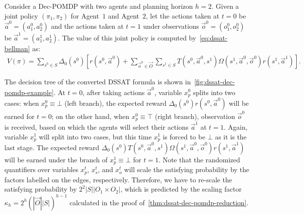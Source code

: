 \begin{example}
    Consider a Dec-POMDP with two agents and planning horizon $h=2$.
    Given a joint policy $(\pi_1,\pi_2)$ for Agent~$1$ and Agent~$2$,
    let the actions taken at $t=0$ be $\vec{a}^0=(a_1^0,a_2^0)$ and
    the actions taken at $t=1$ under observations $\vec{o}^0=(o_1^0,o_2^0)$ be $\vec{a}^1=(a_1^1,a_2^1)$.
    The value of this joint policy is computed by~\cref{eq:dssat-bellman} as:
    \begin{align*}
        V(\pi)=
        \sum_{s^0\in S}\Delta_0(s^0)[r(s^0,\vec{a}^0)+
            \sum_{\vec{o}^0\in\vec{O}}\sum_{s^1\in S}T(s^0,\vec{a}^0,s^1)\Omega(s^1,\vec{a}^0,\vec{o}^0)r(s^1,\vec{a}^1)].
    \end{align*}

    The decision tree of the converted DSSAT formula is shown in~\cref{fig:dssat-dec-pomdp-example}.
    At $t=0$,
    after taking actions $\vec{a}^0$,
    variable $x_p^0$ splits into two cases:
    when $x_p^0\equiv\bot$ (left branch),
    the expected reward $\Delta_0(s^0)r(s^0,\vec{a}^0)$ will be earned for $t=0$;
    on the other hand,
    when $x_p^0\equiv\top$ (right branch),
    observation $\vec{o}^0$ is received,
    based on which the agents will select their actions $\vec{a}^1$ at $t=1$.
    Again, variable $x_p^1$ will split into two cases,
    but this time $x_p^1$ is forced to be $\bot$ as it is the last stage.
    The expected reward $\Delta_0(s^0)T(s^0,\vec{a}^0,s^1)\Omega(s^1,\vec{a}^0,\vec{o}^0)r(s^1,\vec{a}^1)$ will be earned under the branch of $x_p^1\equiv\bot$ for $t=1$.
    Note that the randomized quantifiers over variables $x_p^t$, $x_s^t$, and $x_o^t$ will scale the satisfying probability by the factors labelled on the edges, respectively.
    Therefore, we have to re-scale the satisfying probability by $2^2|S||O_1\times O_2|$,
    which is predicted by the scaling factor $\kappa_{h}=2^h(|\vec{O}||S|)^{h-1}$ calculated in the proof of~\cref{thm:dssat-dec-pomdp-reduction}.
\end{example}